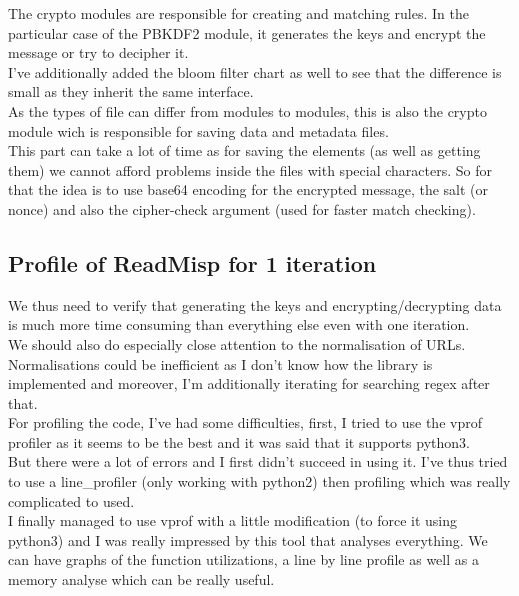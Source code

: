 \documentclass{eplmastersthesis}
\begin{document}
The crypto modules are responsible for creating and matching rules. In the particular case of the PBKDF2 module, it generates the keys and encrypt the message or try to decipher it.\\
I've additionally added the bloom filter chart as well to see that the difference is small as they inherit the same interface.\\

As the types of file can differ from modules to modules, this is also the crypto module wich is responsible for saving data and metadata files.\\
This part can take a lot of time as for saving the elements (as well as getting them) we cannot afford problems inside the files with special characters. So for that the idea is to use base64 encoding for the encrypted message, the salt (or nonce) and also the cipher-check argument (used for faster match checking).\\


\subsection{Profile of ReadMisp for 1 iteration}
We thus need to verify that generating the keys and encrypting/decrypting data is much more time consuming than everything else even with one iteration.\\
We should also do especially close attention to the normalisation of URLs. Normalisations could be inefficient as I don't know how the library is implemented and moreover, I'm additionally iterating for searching regex after that.\\

For profiling the code, I've had some difficulties, first, I tried to use the vprof profiler as it seems to be the best and it was said that it supports python3.\\
But there were a lot of errors and I first didn't succeed in using it. I've thus tried to use a line\_profiler (only working with python2) then profiling which was really complicated to used. \\
I finally managed to use vprof with a little modification (to force it using python3) and I was really impressed by this tool that analyses everything. We can have graphs of the function utilizations, a line by line profile as well as a memory analyse which can be really useful.\\
\end{document}
